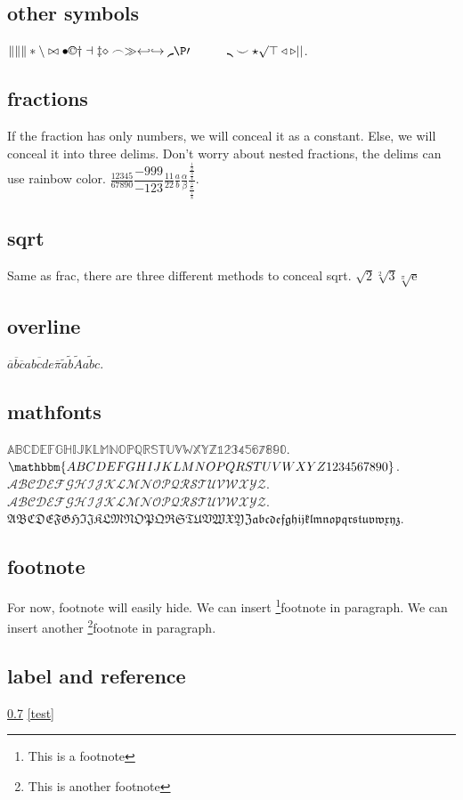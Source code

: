 \documentclass{ctexbook}
\begin{document}
\subsection{other symbols}
\(\| \lVert \rVert \ast \backslash \bowtie \bullet \copyright \dagger \dashv \ddagger \diamond \frown \gg \hookleftarrow \hookrightarrow \lmoustache \P \prime \quad \qquad \rmoustache \smile \star \surd \top \triangleleft \triangleright \lvert \rvert \).

\subsection{fractions}
If the fraction has only numbers, we will conceal it as a constant.
Else, we will conceal it into three delims. Don't worry about nested fractions, the delims can use rainbow color.
\(\frac{12345}{67890} \dfrac{-999}{-123} \tfrac{11}{22} \frac{a}{b} \frac{\alpha}{\beta} \frac{\frac{\frac{1}{2}}{\frac{3}{4}}}{\frac{\frac{5}{6}}{\frac{7}{8}}}\).

\subsection{sqrt}
Same as frac, there are three different methods to conceal sqrt.
\(\sqrt{2} \sqrt[2]{3} \sqrt[\pi]{\mathrm{e}}\)
\subsection{overline}
\(\overline{a} \overline{b} \overline{c} \overline{abcde}  \overline{\pi} \tilde{a} \tilde{b} \tilde{A} \tilde{abc} \).

\subsection{mathfonts}
\(\mathbb{ABCDEFGHIJKLMNOPQRSTUVWXYZ1234567890} \).
\(\mathbbm{ABCDEFGHIJKLMNOPQRSTUVWXYZ1234567890} \).
\(\mathcal{ABCDEFGHIJKLMNOPQRSTUVWXYZ}\).
\(\mathscr{ABCDEFGHIJKLMNOPQRSTUVWXYZ}\).
\(\mathfrak{ABCDEFGHIJKLMNOPQRSTUVWXYZabcdefghijklmnopqrstuvwxyz}\).

\subsection{footnote}
For now, footnote will easily hide.
We can insert \footnote{This is a footnote}{footnote} in paragraph.
We can insert another \footnote{This is another footnote}{footnote} in paragraph.

\subsection{label and reference}
\label{test} \ref{test} \eqref{test} 
\end{document}
